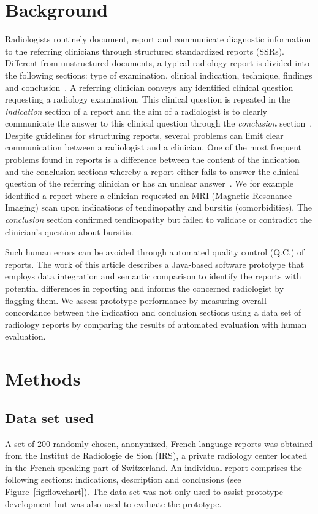 \documentclass{IOS-Book-Article}
\begin{document}
\section{Background} 
Radiologists routinely document, report and communicate diagnostic information to the referring clinicians through structured standardized reports (SSRs).
Different from unstructured documents, a typical radiology report is divided into the following sections: type of examination, clinical indication, technique, findings and conclusion~\cite{14132795, Brady2018}.
A referring clinician conveys any identified clinical question requesting a radiology examination. This clinical question is repeated in the \emph{indication} section of a report and the aim of a radiologist is to clearly communicate the answer to this clinical question through the \emph{conclusion} section~\cite{Wallis2011}.
Despite guidelines for structuring reports, several problems can limit clear communication between a radiologist and a clinician.
One of the most frequent problems found in reports is a difference between the content of the indication and the conclusion sections whereby a report either fails to answer the clinical question of the referring clinician or has an unclear answer~\cite{ecr2014}.
We for example identified a report where a clinician requested an MRI (Magnetic Resonance Imaging) scan upon indications of tendinopathy and bursitis (comorbidities).
The \emph{conclusion} section confirmed tendinopathy but failed to validate or contradict the clinician's question about bursitis.

Such human errors can be avoided through automated quality control (Q.C.) of reports. The work of this article describes a Java-based software prototype that employs data integration and semantic comparison to identify the reports with potential differences in reporting and informs the concerned radiologist by flagging them.
We assess prototype performance by measuring overall concordance between the indication and conclusion sections using a data set of radiology reports by comparing the results of automated evaluation with human evaluation.
%
\section{Methods}
%
\subsection{Data set used}
\label{dataset}
%
A set of 200 randomly-chosen, anonymized, French-language reports was obtained from the  Institut de Radiologie de Sion (IRS), a private radiology center located in the French-speaking part of Switzerland.
An individual report comprises the following sections: indications, description and conclusions (see Figure~\ref{fig:flowchart}).
The data set was not only used to assist prototype development but was also used to evaluate the prototype.
%
\end{document}
